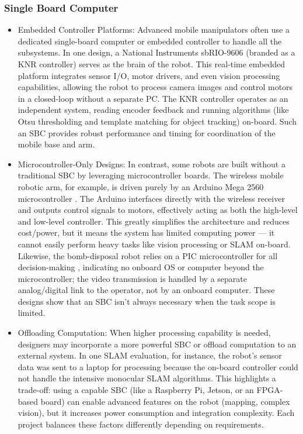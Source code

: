 \documentclass{article}
\begin{document}
\subsubsection{Single Board Computer}

\begin{itemize}
  
  \item Embedded Controller Platforms: Advanced mobile manipulators often use a dedicated single-board computer or embedded controller to handle all the subsystems. In one design, a National Instruments sbRIO-9606 (branded as a KNR controller) serves as the brain of the robot\cite{7475009}. This real-time embedded platform integrates sensor I/O, motor drivers, and even vision processing capabilities, allowing the robot to process camera images and control motors in a closed-loop without a separate PC. The KNR controller operates as an independent system, reading encoder feedback and running algorithms (like Otsu thresholding and template matching for object tracking) on-board. Such an SBC provides robust performance and timing for coordination of the mobile base and arm.
  \item Microcontroller-Only Designs: In contrast, some robots are built without a traditional SBC by leveraging microcontroller boards. The wireless mobile robotic arm, for example, is driven purely by an Arduino Mega 2560 microcontroller \cite{YUSOFF20121072}. The Arduino interfaces directly with the wireless receiver and outputs control signals to motors, effectively acting as both the high-level and low-level controller. This greatly simplifies the architecture and reduces cost/power, but it means the system has limited computing power — it cannot easily perform heavy tasks like vision processing or SLAM on-board. Likewise, the bomb-disposal robot relies on a PIC microcontroller for all decision-making \cite{6805994}, indicating no onboard OS or computer beyond the microcontroller; the video transmission is handled by a separate analog/digital link to the operator, not by an onboard computer. These designs show that an SBC isn't always necessary when the task scope is limited.
  \item Offloading Computation: When higher processing capability is needed, designers may incorporate a more powerful SBC or offload computation to an external system. In one SLAM evaluation, for instance, the robot's sensor data was sent to a laptop for processing because the on-board controller could not handle the intensive monocular SLAM algorithms. This highlights a trade-off: using a capable SBC (like a Raspberry Pi, Jetson, or an FPGA-based board) can enable advanced features on the robot (mapping, complex vision), but it increases power consumption and integration complexity. Each project balances these factors differently depending on requirements.

\end{itemize}
\end{document}

